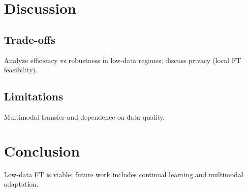 \documentclass[10pt]{article}
\begin{document}
\section{Discussion}
\subsection{Trade-offs}
Analyze efficiency vs robustness in low-data regimes; discuss privacy (local FT feasibility).

\subsection{Limitations}
Multimodal transfer and dependence on data quality.

\section{Conclusion}
Low-data FT is viable; future work includes continual learning and multimodal adaptation.



\end{document}

